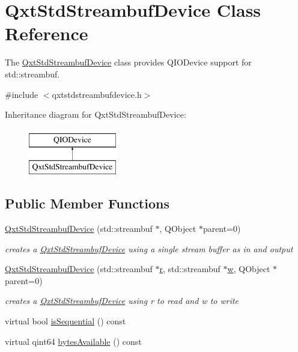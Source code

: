 \hypertarget{class_qxt_std_streambuf_device}{\section{Qxt\-Std\-Streambuf\-Device Class Reference}
\label{class_qxt_std_streambuf_device}
}


The \hyperlink{class_qxt_std_streambuf_device}{Qxt\-Std\-Streambuf\-Device} class provides Q\-I\-O\-Device support for std\-::streambuf.  




{\ttfamily \#include $<$qxtstdstreambufdevice.\-h$>$}

Inheritance diagram for Qxt\-Std\-Streambuf\-Device\-:\begin{figure}[H]
\begin{center}
\leavevmode
\includegraphics[height=2.000000cm]{class_qxt_std_streambuf_device}
\end{center}
\end{figure}
\subsection*{Public Member Functions}
\begin{DoxyCompactItemize}
\item 
\hyperlink{class_qxt_std_streambuf_device_a30be46c81f96731ec1b64ada30ed1192}{Qxt\-Std\-Streambuf\-Device} (std\-::streambuf $\ast$, Q\-Object $\ast$parent=0)
\begin{DoxyCompactList}\small\item\em creates a \hyperlink{class_qxt_std_streambuf_device}{Qxt\-Std\-Streambuf\-Device} using a single stream buffer as in and output \end{DoxyCompactList}\item 
\hyperlink{class_qxt_std_streambuf_device_a94b2188eafc91b915c14900c454d2f03}{Qxt\-Std\-Streambuf\-Device} (std\-::streambuf $\ast$\hyperlink{glext_8h_abe08814c2f72843fde4d8df41440d5a0}{r}, std\-::streambuf $\ast$\hyperlink{glext_8h_ac1795f3b2fee217274b85c2750e1a889}{w}, Q\-Object $\ast$parent=0)
\begin{DoxyCompactList}\small\item\em creates a \hyperlink{class_qxt_std_streambuf_device}{Qxt\-Std\-Streambuf\-Device} using {\itshape r} to read and {\itshape w} to write \end{DoxyCompactList}\item 
virtual bool \hyperlink{class_qxt_std_streambuf_device_a27181c0b15046f5fb0b604d297840fc0}{is\-Sequential} () const 
\item 
virtual qint64 \hyperlink{class_qxt_std_streambuf_device_a1a5dbb127a1387c647b1d92dc05e7e61}{bytes\-Available} () const 
\end{DoxyCompactItemize}
